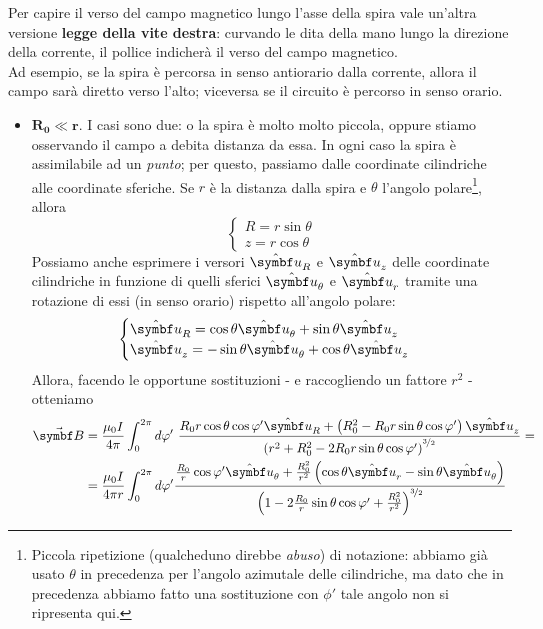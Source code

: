 \begin{observe}
	Per capire il verso del campo magnetico lungo l'asse della spira vale un'altra versione \textbf{legge della vite destra}: curvando le dita della mano lungo la direzione della corrente, il pollice indicherà il verso del campo magnetico.\\
	Ad esempio, se la spira è percorsa in senso antiorario dalla corrente, allora il campo sarà diretto verso l'alto; viceversa se il circuito è percorso in senso orario.
\end{observe}
\begin{itemize}
	\item $\mathbf{R_0\ll r.}$ I casi sono due: o la spira è molto molto piccola, oppure stiamo osservando il campo a debita distanza da essa. In ogni caso la spira è assimilabile ad un \textit{punto}; per questo, passiamo dalle coordinate cilindriche alle coordinate sferiche. Se $r$ è la distanza dalla spira e $\theta$ l'angolo polare\footnote{Piccola ripetizione (qualcheduno direbbe \textit{abuso}) di notazione: abbiamo già usato $\theta$ in precedenza per l'angolo azimutale delle cilindriche, ma dato che in precedenza abbiamo fatto una sostituzione con $\phi'$ tale angolo non si ripresenta qui.}, allora 
	\begin{equation*}
		\begin{cases}
			R=r\sin\theta\\
			z=r\cos\theta
		\end{cases}
	\end{equation*}
	Possiamo anche esprimere i versori $\vbh{u}_R$ e $\vbh{u}_z$ delle coordinate cilindriche in funzione di quelli sferici $\vbh{u}_{\theta}$ e $\vbh{u}_r$ tramite una rotazione di essi (in senso orario) rispetto all'angolo polare:
	\begin{equation*}
		\begin{cases}
			\vbh{u}_R=\cos\theta\vbh{u}_{\theta}+\sin\theta\vbh{u}_{z}\\
			\vbh{u}_z=-\sin\theta\vbh{u}_{\theta}+\cos\theta\vbh{u}_{z}
		\end{cases}
	\end{equation*}
	Allora, facendo le opportune sostituzioni - e raccogliendo un fattore $r^2$ - otteniamo
	\begin{align*}
		\vba{B}&=\frac{\mu_0 I}{4\pi }\int_0^{2\pi}d\phi'\ \frac{R_0r\cos\theta\cos\phi'\vbh{u}_R+\left(R_0^2-R_0r\sin\theta\cos\phi'\right)\vbh{u}_z}{\left(r^2+R_0^2-2R_0r\sin\theta\cos\phi'\right)^{\nicefrac{3}{2}}}=\\
		&=\frac{\mu_0 I}{4\pi r}\int_0^{2\pi}d\phi'\frac{\frac{R_0}{r}\cos\phi'\vbh{u}_{\theta}+\frac{R_0^2}{r^2}\left(\cos\theta\vbh{u}_r-\sin\theta\vbh{u}_\theta\right)}{\left(1-2\frac{R_0}{r}\sin\theta\cos\phi'+\frac{R_0^2}{r^2}\right)^{\nicefrac{3}{2}}}

\end{align*}
\end{itemize}
